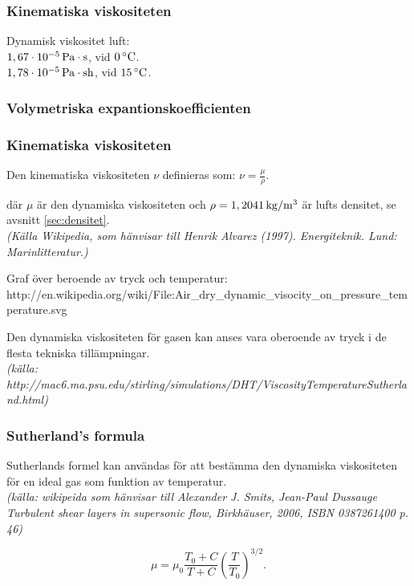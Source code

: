 \subsubsection{Kinematiska viskositeten} %
Dynamisk viskositet luft:\\
$\unit[1,67\cdot10^{-5}]{Pa\cdot s}$, vid $\unit[0]{^\circ C}$.\\
$\unit[1,78\cdot10^{-5}]{Pa\cdot sh}$, vid $\unit[15]{^\circ C}$.


\subsubsection{Volymetriska expantionskoefficienten}

\subsubsection{Kinematiska viskositeten}


Den kinematiska viskositeten $\nu$ definieras som: $\nu = \frac {\mu} {\rho}.$


där $\mu$ är den dynamiska viskositeten och $\rho=\unit[1,2041]{kg/m^3}$ är lufts densitet, se avsnitt \ref{sec:densitet}.\\
\emph{(Källa Wikipedia, som hänvisar till Henrik Alvarez (1997). Energiteknik. Lund: Marinlitteratur.)}

Graf över beroende av tryck och temperatur:\\
http://en.wikipedia.org/wiki/File:Air\_dry\_dynamic\_visocity\_on\_pressure\_temperature.svg

Den dynamiska viskositeten för gasen kan anses vara oberoende av tryck i de flesta tekniska tillämpningar. \\
\emph{(källa: http://mac6.ma.psu.edu/stirling/simulations/DHT/ViscosityTemperatureSutherland.html)}

\subsubsection{Sutherland's formula}
Sutherlands formel kan användas för att bestämma den dynamiska viskositeten för en ideal gas som funktion av temperatur.\\
\emph{(källa: wikipeida som hänvisar till Alexander J. Smits, Jean-Paul Dussauge Turbulent shear layers in supersonic flow, Birkhäuser, 2006, ISBN 0387261400 p. 46)}

\begin{equation}
{\mu} = {\mu}_0 \frac {T_0+C} {T + C} \left (\frac {T} {T_0} \right )^{3/2}.
\end{equation}

